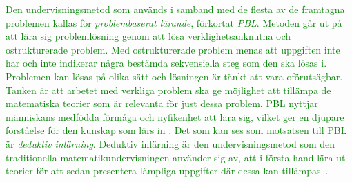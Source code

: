 \textcolor{green}{Den undervisningsmetod som används i samband med de flesta av de framtagna problemen kallas för \textit{problembaserat lärande}, förkortat \textit{PBL}. Metoden går ut på att lära sig problemlösning genom att lösa verklighetsanknutna och ostrukturerade problem. Med ostrukturerade problem menas att uppgiften inte har och inte indikerar några bestämda sekvensiella steg som den ska lösas i. Problemen kan lösas på olika sätt och lösningen är tänkt att vara oförutsägbar. Tanken är att arbetet med verkliga problem ska ge möjlighet att tillämpa de matematiska teorier som är relevanta för just dessa problem. PBL nyttjar människans medfödda förmåga och nyfikenhet att lära sig, vilket ger en djupare förståelse för den kunskap som lärs in \cite{PBLdefinition} \cite{djupareKunskapPBL}. Det som kan ses som motsatsen till PBL är \textit{deduktiv inlärning}. Deduktiv inlärning är den undervisningsmetod som den traditionella matematikundervisningen använder sig av, att i första hand lära ut teorier för att sedan presentera lämpliga uppgifter där dessa kan tillämpas~\cite{deduktivInlärning}.}

%
%
%
%
%
